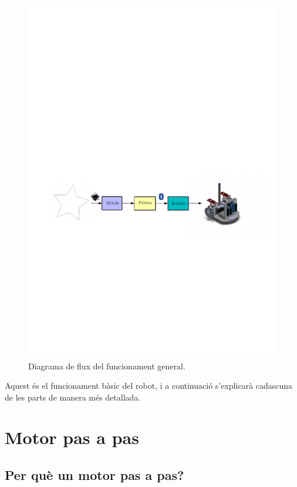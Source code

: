 \begin{figure}[H]
	\centering
	\includegraphics{Flux}
	\caption{Diagrama de flux del funcionament general.}
	\label{fig:flux}
\end{figure}

Aquest és el funcionament bàsic del robot, i a continuació s'explicarà cadascuna de les parts de manera més detallada. 












\section{Motor pas a pas}
\subsection{Per què un motor pas a pas?}

